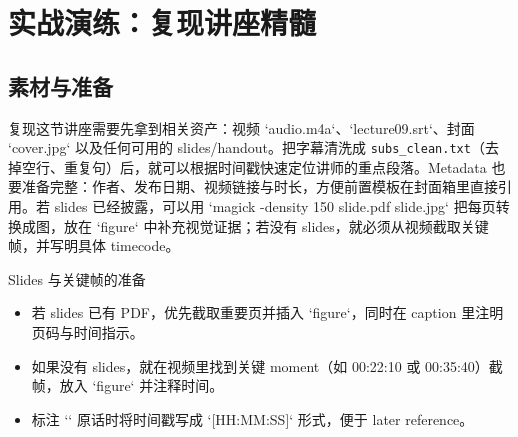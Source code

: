 \documentclass[a4paper]{article}
\begin{document}
\section{实战演练：复现讲座精髓}

\subsection{素材与准备}
复现这节讲座需要先拿到相关资产：视频 `audio.m4a`、`lecture09.srt`、封面 `cover.jpg` 以及任何可用的 slides/handout。把字幕清洗成 \texttt{subs\_clean.txt}（去掉空行、重复句）后，就可以根据时间戳快速定位讲师的重点段落。Metadata 也要准备完整：作者、发布日期、视频链接与时长，方便前置模板在封面箱里直接引用。若 slides 已经披露，可以用 `magick -density 150 slide.pdf slide.jpg` 把每页转换成图，放在 `figure` 中补充视觉证据；若没有 slides，就必须从视频截取关键帧，并写明具体 timecode。

\begin{knowledgebox}{Slides 与关键帧的准备}
\begin{itemize}
    \item 若 slides 已有 PDF，优先截取重要页并插入 `figure`，同时在 caption 里注明页码与时间指示。
    \item 如果没有 slides，就在视频里找到关键 moment（如 00:22:10 或 00:35:40）截帧，放入 `figure` 并注释时间。
    \item 标注 `\textit{}` 原话时将时间戳写成 `[HH:MM:SS]` 形式，便于 later reference。
\end{itemize}
\end{knowledgebox}
\end{document}
